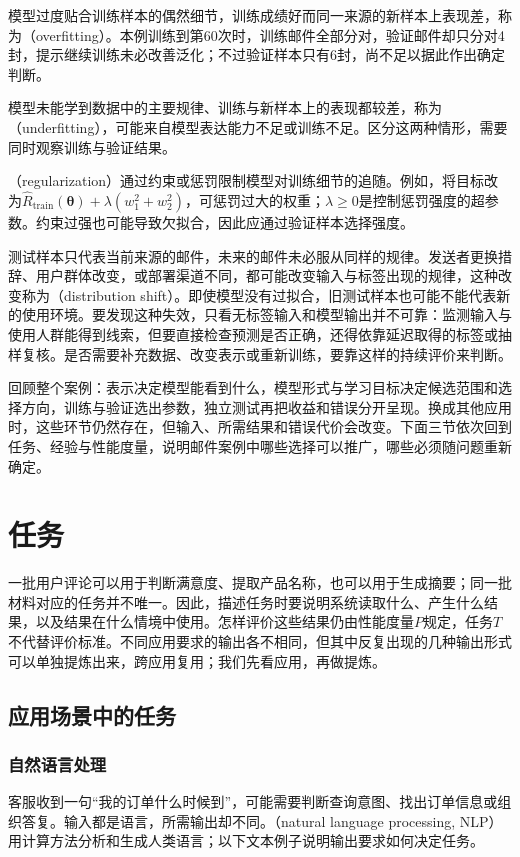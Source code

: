 模型过度贴合训练样本的偶然细节，训练成绩好而同一来源的新样本上表现差，称为（overfitting）。本例训练到第60次时，训练邮件全部分对，验证邮件却只分对4封，提示继续训练未必改善泛化；不过验证样本只有6封，尚不足以据此作出确定判断。

模型未能学到数据中的主要规律、训练与新样本上的表现都较差，称为（underfitting），可能来自模型表达能力不足或训练不足。区分这两种情形，需要同时观察训练与验证结果。

（regularization）通过约束或惩罚限制模型对训练细节的追随。例如，将目标改为$\hat{R}_{\mathrm{train}}(\bm{\theta})+\lambda(w_1^2+w_2^2)$，可惩罚过大的权重；$\lambda\geq0$是控制惩罚强度的超参数。约束过强也可能导致欠拟合，因此应通过验证样本选择强度。

测试样本只代表当前来源的邮件，未来的邮件未必服从同样的规律。发送者更换措辞、用户群体改变，或部署渠道不同，都可能改变输入与标签出现的规律，这种改变称为（distribution shift）。即使模型没有过拟合，旧测试样本也可能不能代表新的使用环境。要发现这种失效，只看无标签输入和模型输出并不可靠：监测输入与使用人群能得到线索，但要直接检查预测是否正确，还得依靠延迟取得的标签或抽样复核。是否需要补充数据、改变表示或重新训练，要靠这样的持续评价来判断。

回顾整个案例：表示决定模型能看到什么，模型形式与学习目标决定候选范围和选择方向，训练与验证选出参数，独立测试再把收益和错误分开呈现。换成其他应用时，这些环节仍然存在，但输入、所需结果和错误代价会改变。下面三节依次回到任务、经验与性能度量，说明邮件案例中哪些选择可以推广，哪些必须随问题重新确定。

\section{任务}
\label{sec:machine-learning-tasks}

一批用户评论可以用于判断满意度、提取产品名称，也可以用于生成摘要；同一批材料对应的任务并不唯一。因此，描述任务时要说明系统读取什么、产生什么结果，以及结果在什么情境中使用。怎样评价这些结果仍由性能度量$P$规定，任务$T$不代替评价标准。不同应用要求的输出各不相同，但其中反复出现的几种输出形式可以单独提炼出来，跨应用复用；我们先看应用，再做提炼。

\subsection{应用场景中的任务}

\subsubsection{自然语言处理}
客服收到一句“我的订单什么时候到”，可能需要判断查询意图、找出订单信息或组织答复。输入都是语言，所需输出却不同。（natural language processing, NLP）用计算方法分析和生成人类语言；以下文本例子说明输出要求如何决定任务。

